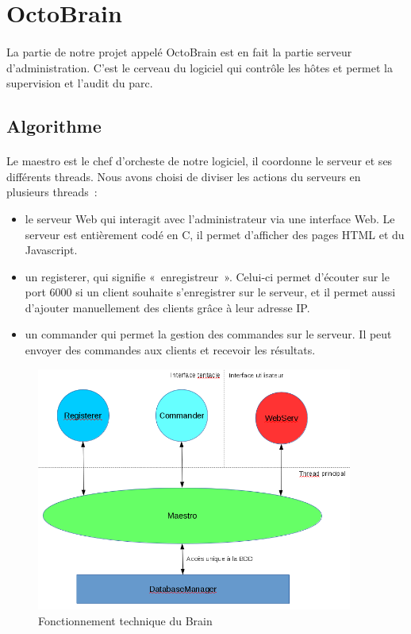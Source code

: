 \section{OctoBrain}

\paragraph{}
La partie de notre projet appelé OctoBrain est en fait la partie serveur d'administration. C'est le cerveau du logiciel qui contrôle les hôtes et permet la supervision et l'audit du parc.

\subsection{Algorithme}
\paragraph{}
Le maestro est le chef d'orcheste de notre logiciel, il coordonne le serveur et ses différents threads.
Nous avons choisi de diviser les actions du serveurs en plusieurs threads :
\begin{itemize}
    \item le serveur Web qui interagit avec l'administrateur via une interface Web. Le serveur est entièrement codé en C, il permet d'afficher des pages HTML et du Javascript.
    \item un registerer, qui signifie « enregistreur ». Celui-ci permet d'écouter sur le port 6000 si un client souhaite s'enregistrer sur le serveur, et il permet aussi d'ajouter manuellement des clients grâce à leur adresse IP.
    \item un commander qui permet la gestion des commandes sur le serveur. Il peut envoyer des commandes aux clients et recevoir les résultats.
\end{itemize}

\begin{figure}[h]
    \begin{center}
        \includegraphics[height=8cm, keepaspectratio=true]{img/algo_brain_full.png}
        \caption{Fonctionnement technique du Brain}
    \end{center} 
\end{figure}

